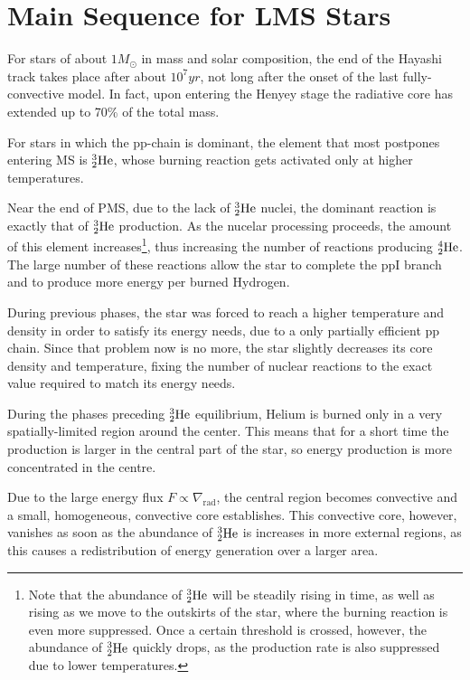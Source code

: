 \section{Main Sequence for LMS Stars}

For stars of about $1M_{\odot}$ in mass and solar composition, the end of the Hayashi track takes place after about $10^{7}\unit{yr}$, not long after the onset of the last fully-convective model. In fact, upon entering the Henyey stage the radiative core has extended up to 70\% of the total mass.
\par For stars in which the pp-chain is dominant, the element that most postpones entering MS is $\element{He}{3}{2}$, whose burning reaction gets activated only at higher temperatures.
\par Near the end of PMS, due to the lack of $\element{He}{3}{2}$ nuclei, the dominant reaction is exactly that of $\element{He}{3}{2}$ production. As the nucelar processing proceeds, the amount of this element increases\footnote{Note that the abundance of $\element{He}{3}{2}$ will be steadily rising in time, as well as rising as we move to the outskirts of the star, where the burning reaction is even more suppressed. Once a certain threshold is crossed, however, the abundance of $\element{He}{3}{2}$ quickly drops, as the production rate is also suppressed due to lower temperatures.}, thus increasing the number of reactions producing $\element{He}{4}{2}$. The large number of these reactions allow the star to complete the ppI branch and to produce more energy per burned Hydrogen.
\par During previous phases, the star was forced to reach a higher temperature and density in order to satisfy its energy needs, due to a only partially efficient pp chain. Since that problem now is no more, the star slightly decreases its core density and temperature, fixing the number of nuclear reactions to the exact value required to match its energy needs.
\par During the phases preceding $\element{He}{3}{2}$ equilibrium, Helium is burned only in a very spatially-limited region around the center. This means that for a short time the production is larger in the central part of the star, so energy production is more concentrated in the centre.
\par Due to the large energy flux $F \propto \nabla_{\text{rad}}$, the central region becomes convective and a small, homogeneous, convective core establishes. This convective core, however, vanishes as soon as the abundance of $\element{He}{3}{2}$ is increases in more external regions, as this causes a redistribution of energy generation over a larger area.
